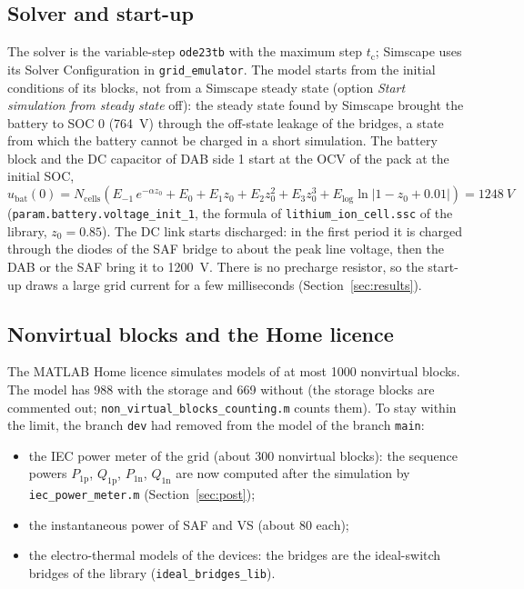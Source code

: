 \documentclass[11pt,a4paper]{scrartcl}
\newcommand{\ped}[1]{_{\mathrm{#1}}}
\newcommand{\code}[1]{\texttt{#1}}
\begin{document}
\begin{onehalfspace}
\subsection{Solver and start-up}
\label{sec:startup}

The solver is the variable-step \code{ode23tb} with the maximum step $t\ped{c}$; Simscape uses its Solver Configuration in \code{grid\_emulator}. The model starts from the initial conditions of its blocks, not from a Simscape steady state (option \emph{Start simulation from steady state} off): the steady state found by Simscape brought the battery to SOC 0 (\SI{764}{V}) through the off-state leakage of the bridges, a state from which the battery cannot be charged in a short simulation. The battery block and the DC capacitor of DAB side 1 start at the OCV of the pack at the initial SOC,
\begin{equation}
	u\ped{bat}(0) = N\ped{cells}\left(E_{-1}\,e^{-\alpha z_0} + E_0 + E_1 z_0 + E_2 z_0^2 + E_3 z_0^3 + E\ped{log}\ln\left|1 - z_0 + 0.01\right|\right) = \SI{1248}{V}
	\label{eq:ocv}
\end{equation}
(\code{param.battery.voltage\_init\_1}, the formula of \code{lithium\_ion\_cell.ssc} of the library, $z_0 = 0.85$). The DC link starts discharged: in the first period it is charged through the diodes of the SAF bridge to about the peak line voltage, then the DAB or the SAF bring it to \SI{1200}{V}. There is no precharge resistor, so the start-up draws a large grid current for a few milliseconds (Section~\ref{sec:results}).

\subsection{Nonvirtual blocks and the Home licence}
\label{sec:licence}

The MATLAB Home licence simulates models of at most \num{1000} nonvirtual blocks. The model has 988 with the storage and 669 without (the storage blocks are commented out; \code{non\_virtual\_blocks\_counting.m} counts them). To stay within the limit, the branch \code{dev} had removed from the model of the branch \code{main}:

\begin{itemize}[nosep]
	\item the IEC power meter of the grid (about 300 nonvirtual blocks): the sequence powers $P\ped{1p}$, $Q\ped{1p}$, $P\ped{1n}$, $Q\ped{1n}$ are now computed after the simulation by \code{iec\_power\_meter.m} (Section~\ref{sec:post});
	\item the instantaneous power of SAF and VS (about 80 each);
	\item the electro-thermal models of the devices: the bridges are the ideal-switch bridges of the library (\code{ideal\_bridges\_lib}).
\end{itemize}


\end{onehalfspace}
\end{document}
